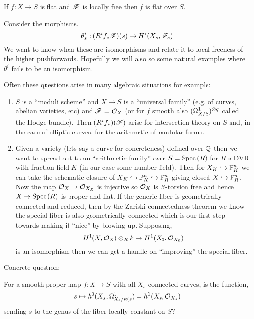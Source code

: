 \documentclass[12pt]{article}
\begin{document}
\begin{example}
If $f : X \to S$ is flat and $\mathscr{F}$ is locally free then $f$ is flat over $S$.
\end{example}

Consider the morphisms,
\[ \theta^i_s  : (R^i f_* \mathscr{F})(s) \to H^i(X_s, \mathscr{F}_s) \]
We want to know when these are isomorphisms and relate it to local freeness of the higher pushforwards. Hopefully we will also so some natural examples where $\theta^i$ fails to be an isomorphism. 

\begin{rmk}
Often these questions arise in many algebraic situations for example:
\begin{enumerate}
\item $S$ is a ``moduli scheme'' and $X \to S$ is a ``universal family'' (e.g. of curves, abelian varieties, etc) and $\mathscr{F} = \mathcal{O}_{X}$ (or for $f$ smooth also  $(\Omega_{X/S}^1)^{\otimes q}$ called the Hodge bundle). Then $(R^i f_*)(\mathscr{F})$ arise for intersection theory on $S$ and, in the case of elliptic curves, for the arithmetic of modular forms.

\item Given a variety (lets say a curve for concreteness) defined over $\mathbb{Q}$ then we want to spread out to an ``arithmetic family'' over $S = \mathrm{Spec}\left( R \right)$ for $R$ a DVR with fraction field $K$ (in our case some number field). Then for $X_K \hookrightarrow \mathbb{P}^n_K$ we can take the schematic closure of $X_K \hookrightarrow \mathbb{P}^n_K \hookrightarrow \mathbb{P}^n_R$ giving closed $X \hookrightarrow \mathbb{P}^n_R$. Now the map $\mathcal{O}_{X} \to \mathcal{O}_{X_K}$ is injective so $\mathcal{O}_{X}$ is $R$-torsion free and hence $X \to \mathrm{Spec}\left( R \right)$ is proper and flat. If the generic fiber is geometrically connected and reduced, then by the Zariski connectedness theorem we know the special fiber is also geometrically connected which is our first step towards making it ``nice'' by blowing up. Supposing,
\[ H^1(X, \mathcal{O}_{X}) \otimes_R k \to H^1(X_0, \mathcal{O}_{X_0}) \]
is an isomorphism then we can get a handle on ``improving'' the special fiber.
\end{enumerate}
\end{rmk}

Concrete question:

\begin{example}
For a smooth proper map $f : X \to S$ with all $X_{\bar{s}}$ connected curves, is the function,
\[ s \mapsto h^0(X_s, \Omega^1_{X_s/\kappa(s}) = h^1(X_s, \mathcal{O}_{X_s}) \]
sending $s$ to the genus of the fiber locally constant on $S$?  
\end{example}
\end{document}
